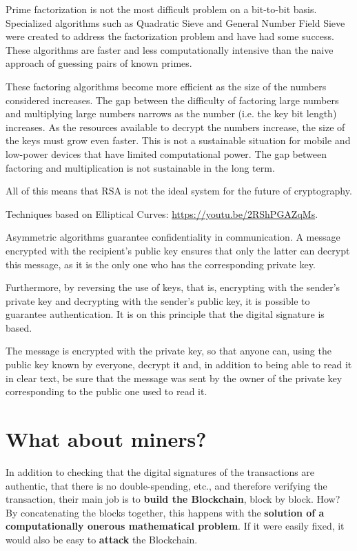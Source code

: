 Prime factorization is not the most difficult problem on a bit-to-bit basis. Specialized algorithms such as Quadratic Sieve and General Number Field Sieve were created to address the factorization problem and have had some success. These algorithms are faster and less computationally intensive than the naive approach of guessing pairs of known primes.

These factoring algorithms become more efficient as the size of the numbers considered increases. The gap between the difficulty of factoring large numbers and multiplying large numbers narrows as the number (i.e. the key bit length) increases. As the resources available to decrypt the numbers increase, the size of the keys must grow even faster. This is not a sustainable situation for mobile and low-power devices that have limited computational power. The gap between factoring and multiplication is not sustainable in the long term.

All of this means that RSA is not the ideal system for the future of cryptography.

Techniques based on Elliptical Curves: \url{https://youtu.be/2RShPGAZqMs}.

Asymmetric algorithms guarantee confidentiality in communication. A message encrypted with the recipient's public key ensures that only the latter can decrypt this message, as it is the only one who has the corresponding private key.

Furthermore, by reversing the use of keys, that is, encrypting with the sender's private key and decrypting with the sender's public key, it is possible to guarantee authentication. It is on this principle that the digital signature is based.

The message is encrypted with the private key, so that anyone can, using the public key known by everyone, decrypt it and, in addition to being able to read it in clear text, be sure that the message was sent by the owner of the private key corresponding to the public one used to read it.

\section{What about miners?}

In addition to checking that the digital signatures of the transactions are authentic, that there is no double-spending, etc., and therefore verifying the transaction, their main job is to \textbf{build the Blockchain}, block by block. How? By concatenating the blocks together, this happens with the \textbf{solution of a computationally onerous mathematical problem}. If it were easily fixed, it would also be easy to \textbf{attack} the Blockchain.


